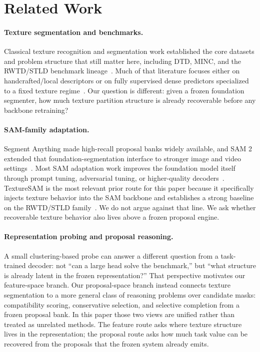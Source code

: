 \section{Related Work}
\label{sec:related}

\paragraph{Texture segmentation and benchmarks.} Classical texture recognition and segmentation work established the core datasets and problem structure that still matter here, including DTD, MINC, and the RWTD/STLD benchmark lineage~\cite{cimpoi2014dtd,bell2015minc,cimpoi2016deepfilterbanks,khan2015stld,khan2017c2f,khan2018learnedstld,mikes2022texturebenchmark}. Much of that literature focuses either on handcrafted/local descriptors or on fully supervised dense predictors specialized to a fixed texture regime~\cite{andrearczyk2017texturefcn,liu2019bowtocnn}. Our question is different: given a frozen foundation segmenter, how much texture partition structure is already recoverable before any backbone retraining?

\paragraph{SAM-family adaptation.} Segment Anything made high-recall proposal banks widely available, and SAM 2 extended that foundation-segmentation interface to stronger image and video settings~\cite{kirillov2023sam,ravi2024sam2}. Most SAM adaptation work improves the foundation model itself through prompt tuning, adversarial tuning, or higher-quality decoders~\cite{ke2023hqsam,zhang2023persam,li2024asam}. TextureSAM is the most relevant prior route for this paper because it specifically injects texture behavior into the SAM backbone and establishes a strong baseline on the RWTD/STLD family~\cite{cohen2025texturesam,cohen2026texturesam}. We do not argue against that line. We ask whether recoverable texture behavior also lives above a frozen proposal engine.

\paragraph{Representation probing and proposal reasoning.} A small clustering-based probe can answer a different question from a task-trained decoder: not ``can a large head solve the benchmark,'' but ``what structure is already latent in the frozen representation?'' That perspective motivates our feature-space branch. Our proposal-space branch instead connects texture segmentation to a more general class of reasoning problems over candidate masks: compatibility scoring, conservative selection, and selective completion from a frozen proposal bank. In this paper those two views are unified rather than treated as unrelated methods. The feature route asks where texture structure lives in the representation; the proposal route asks how much task value can be recovered from the proposals that the frozen system already emits.
